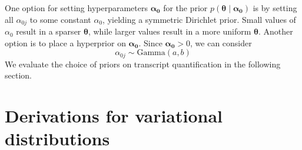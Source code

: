 One option for setting hyperparameters $\bm{\alpha_0}$ for the prior $p(\bm{\theta}\mid\bm{\alpha_0})$ is by setting all $\alpha_{0j}$ to some constant $\alpha_0$, yielding a symmetric Dirichlet prior. Small values of $\alpha_0$ result in a sparser $\bm\theta$, while larger values result in a more uniform $\bm\theta$. Another option is to place a hyperprior on $\bm{\alpha_0}$. Since $\bm{\alpha_0}>0$, we can consider
\begin{equation}
    \alpha_{0j}\sim\textrm{Gamma}(a,b)
\end{equation}
We evaluate the choice of priors on transcript quantification in the following section. 


\chapter{Derivations for variational distributions}\label{sec:variational-dist}

